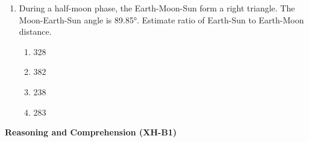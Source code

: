\documentclass{article}
\begin{document}
\begin{enumerate}[leftmargin=*, start=6, label=Q.\arabic*.]
    Rule: The number in a cell represents the count of crosses around its immediate neighboring cells (left, right, top, bottom, diagonals). As per this rule, the maximum number of crosses possible in the empty column is 

    \begin{multicols}{4}
        \begin{enumerate}
            \item 0
            \item 1
            \item 2
            \item 3
        \end{enumerate}
    \end{multicols}

    \item During a half-moon phase, the Earth-Moon-Sun form a right triangle. The Moon-Earth-Sun angle is 89.85°. Estimate ratio of Earth-Sun to Earth-Moon distance.

    \begin{multicols}{4}
        \begin{enumerate}
            \item 328
            \item 382
            \item 238
            \item 283
        \end{enumerate}
    \end{multicols}
\end{enumerate}
 
\maketitle
\noindent \textbf{Reasoning and Comprehension (XH-B1)}
\end{document}
